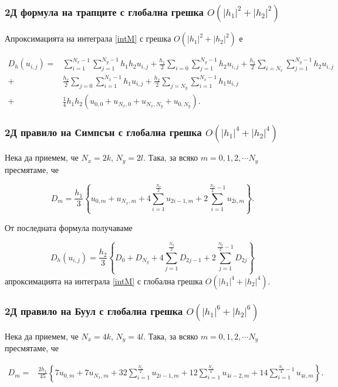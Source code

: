 \documentclass[a4paper]{article}
\theoremstyle{remark}
\begin{document}
\subsubsection{ 2Д формула на трапците с глобална грешка $O(|h_1|^2+|h_2|^2)$ }

Апроксимацията на интеграла \eqref{intM} с грешка $O(|h_1|^2+|h_2|^2)$ е

\begin{align}\label{quadr2}
D_h(u_{i,j}) =& \sum_{i=1}^{N_x-1} \sum_{j=1}^{N_y-1} h_1 h_2 u_{i,j}
+\frac{h_1}{2}\sum_{i=0} \sum_{j=1}^{N_y-1} h_2 u_{i,j}
+\frac{h_1}{2}\sum_{i=N_x} \sum_{j=1}^{N_y-1} h_2 u_{i,j} \nonumber\\
+&\frac{h_2}{2}\sum_{j=0} \sum_{i=1}^{N_x-1} h_1 u_{i,j}
+\frac{h_2}{2}\sum_{j=N_y} \sum_{i=1}^{N_x-1} h_1 u_{i,j}
\nonumber\\
+&\frac{1}{4}h_1 h_2 \left(u_{0,0}+u_{N_x,0}+u_{N_x,N_y}+u_{0,N_y}
\right).
\end{align}

\subsubsection{ 2Д правило на Симпсън с глобална грешка $O(|h_1|^4+|h_2|^4)$}

Нека да приемем, че $N_x=2k$, $N_y=2 l$. Така, за всяко $m=0,1,2,\cdots N_y$ пресмятаме, че

$$D_m= \frac{h_1 }{3} 
\left\{ u_{0,m}+u_{N_x,m}+ 4 \sum_{i=1}^{\frac{N_x}{2}}   u_{2i-1,m}
 +2 \sum_{i=1}^{\frac{N_x}{2}-1} u_{2i,m} \right\}.$$


От последната формула получаваме

\begin{equation}\label{quadr4}
D_h(u_{i,j}) =\frac{h_2 }{3} 
\left\{ D_{0}+D_{N_y}+ 4 \sum_{j=1}^{\frac{N_y}{2}}   D_{2j-1}
 +2 \sum_{j=1}^{{\frac{N_y}{2}}-1} D_{2j} \right\}
\end{equation}
апроксимацията на интеграла \eqref{intM} с глобална грешка $O(|h_1|^4+|h_2|^4)$.


\subsubsection{ 2Д правило на Буул с глобална грешка $O(|h_1|^6+|h_2|^6)$}

Нека да приемем, че $N_x=4k$, $N_y=4 l$. Така, за всяко $m=0,1,2,\cdots N_y$ пресмятаме, че

\begin{align*}
D_m =& \frac{2h_1}{45} 
\left\{
7u_{0,m}+7u_{N_x,m}+32 \sum_{i=1}^{\frac{N_x}{2}}u_{2i-1,m}
+12\sum_{i=1}^{\frac{N_x}{4}}u_{4i-2,m}
+14 \sum_{i=1}^{\frac{N_x}{4}-1}u_{4i,m}
\right\}.
\end{align*}
\end{document}
